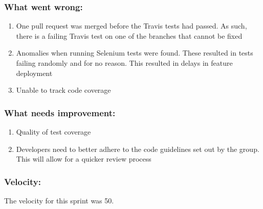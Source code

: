 \documentclass[10pt,onecolumn]{witseiepaper}
\begin{document}
\subsubsection*{What went wrong:}
\begin{enumerate}
	\item One pull request was merged before the Travis tests had passed. As such, there is a failing Travis test on one of the branches that cannot be fixed
	\item Anomalies when running Selenium tests were found. These resulted in tests failing randomly and for no reason. This resulted in delays in feature deployment
	\item Unable to track code coverage
\end{enumerate}

\subsubsection*{What needs improvement:}
\begin{enumerate}
	\item Quality of test coverage
	\item Developers need to better adhere to the code guidelines set out by the group. This will allow for a quicker review process
\end{enumerate}

\subsubsection*{Velocity:}
The velocity for this sprint was 50. 
\end{document}
